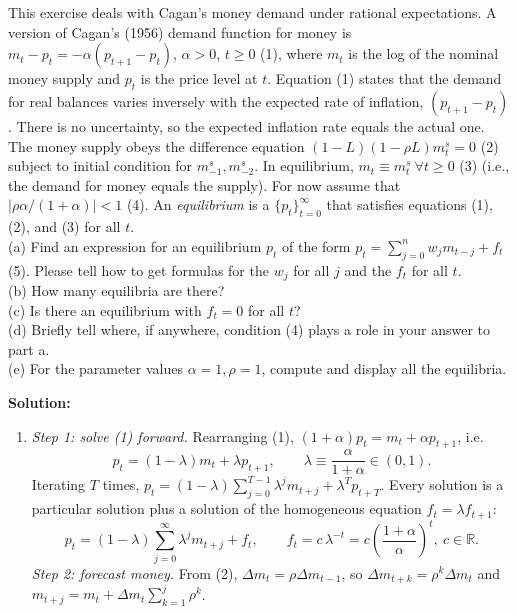 \documentclass[12pt, letterpaper]{article}
\begin{document}
\begin{tcolorbox}[evenbox,title={Exercise 2.8 \quad Cagan Money Demand under Perfect Foresight}]
\begin{tcolorbox}[questionbox]
This exercise deals with Cagan's money demand under rational expectations. A version of Cagan's
(1956) demand function for money is $m_t-p_t=-\alpha(p_{t+1}-p_t)$, $\alpha>0$, $t\ge0$ (1), where
$m_t$ is the log of the nominal money supply and $p_t$ is the price level at $t$. Equation (1)
states that the demand for real balances varies inversely with the expected rate of inflation,
$(p_{t+1}-p_t)$. There is no uncertainty, so the expected inflation rate equals the actual one. The
money supply obeys the difference equation $(1-L)(1-\rho L)m^s_t=0$ (2) subject to initial condition
for $m^s_{-1},m^s_{-2}$. In equilibrium, $m_t\equiv m^s_t\ \forall t\ge0$ (3) (i.e., the demand for
money equals the supply). For now assume that $|\rho\alpha/(1+\alpha)|<1$ (4). An
\textit{equilibrium} is a $\{p_t\}_{t=0}^\infty$ that satisfies equations (1), (2), and (3) for all
$t$.\\[3pt]
(a) Find an expression for an equilibrium $p_t$ of the form $p_t=\sum_{j=0}^nw_jm_{t-j}+f_t$ (5).
Please tell how to get formulas for the $w_j$ for all $j$ and the $f_t$ for all $t$.\\
(b) How many equilibria are there?\\
(c) Is there an equilibrium with $f_t=0$ for all $t$?\\
(d) Briefly tell where, if anywhere, condition (4) plays a role in your answer to part a.\\
(e) For the parameter values $\alpha=1,\rho=1$, compute and display all the equilibria.
\end{tcolorbox}

\textbf{Solution:}

\begin{enumerate}
\item \emph{Step 1: solve (1) forward.} Rearranging (1), $(1+\alpha)p_t=m_t+\alpha p_{t+1}$, i.e.
\[
p_t=(1-\lambda)m_t+\lambda p_{t+1},\qquad \lambda\equiv\frac{\alpha}{1+\alpha}\in(0,1).
\]
Iterating $T$ times, $p_t=(1-\lambda)\sum_{j=0}^{T-1}\lambda^jm_{t+j}+\lambda^Tp_{t+T}$. Every solution
is a particular solution plus a solution of the homogeneous equation $f_t=\lambda f_{t+1}$:
\[
p_t=(1-\lambda)\sum_{j=0}^\infty\lambda^jm_{t+j}+f_t,\qquad
f_t=c\,\lambda^{-t}=c\left(\frac{1+\alpha}{\alpha}\right)^t,\ c\in\mathbb R.
\]
\emph{Step 2: forecast money.} From (2), $\Delta m_t=\rho\Delta m_{t-1}$, so
$\Delta m_{t+k}=\rho^k\Delta m_t$ and $m_{t+j}=m_t+\Delta m_t\sum_{k=1}^j\rho^k$.


\end{enumerate}
\end{tcolorbox}
\end{document}
